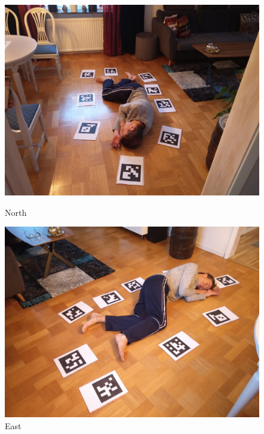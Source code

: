 \begin{figure}
\begin{center}
    \begin{minipage}[t]{0.2\textwidth}
        \includegraphics[width=\textwidth]{images/datasets/P2/images/093311.jpg}
        \caption*{North}
    \end{minipage}
    \begin{minipage}[t]{0.2\textwidth}
        \includegraphics[width=\textwidth]{images/datasets/P2/images/093409.jpg}
        \caption*{East}
    \end{minipage}
    \begin{minipage}[t]{0.2\textwidth}

\end{minipage}
\end{center}
\end{figure}
